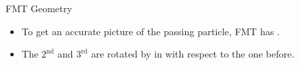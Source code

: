 \begin{frame}{FMT Geometry}
    \label{20.08::fmt_geometry}

    \vspace{6pt}

    \begin{itemize}
        \item
            To get an accurate picture of the passing particle, FMT has .

        \item
            The $2^\text{nd}$ and $3^\text{rd}$ are rotated by  in  with respect to the one before.
    \end{itemize}

    \vspace{6pt}

    \begin{center}
    \end{center}

\end{frame}
